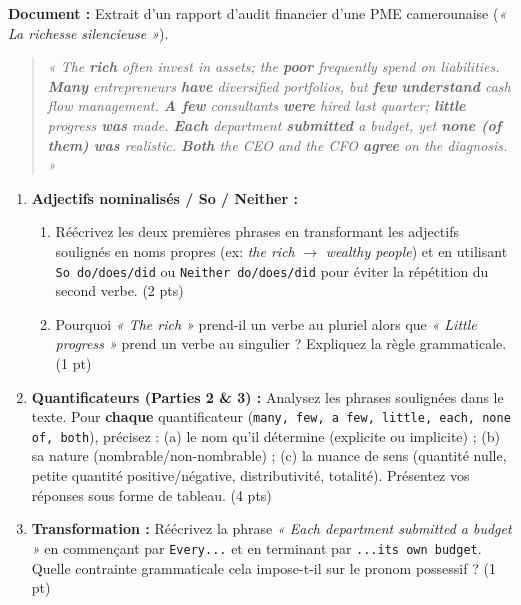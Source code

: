 \documentclass[11pt]{article}
\begin{document}
\begin{exercice}
\textbf{Document :} Extrait d'un rapport d'audit financier d'une PME camerounaise (\textit{« La richesse silencieuse »}).

\begin{quote}
\textit{« The \textbf{rich} often invest in assets; the \textbf{poor} frequently spend on liabilities. \textbf{Many} entrepreneurs \textbf{have} diversified portfolios, but \textbf{few} \textbf{understand} cash flow management. \textbf{A few} consultants \textbf{were} hired last quarter; \textbf{little} progress \textbf{was} made. \textbf{Each} department \textbf{submitted} a budget, yet \textbf{none (of them)} \textbf{was} realistic. \textbf{Both} the CEO and the CFO \textbf{agree} on the diagnosis. »}
\end{quote}

\begin{enumerate}
    \item \textbf{Adjectifs nominalisés / So / Neither :} 
    \begin{enumerate}
        \item Réécrivez les deux premières phrases en transformant les adjectifs soulignés en noms propres (ex: \textit{the rich} $\rightarrow$ \textit{wealthy people}) et en utilisant \texttt{So do/does/did} ou \texttt{Neither do/does/did} pour éviter la répétition du second verbe. (2 pts)
        \item Pourquoi \textit{« The rich »} prend-il un verbe au pluriel alors que \textit{« Little progress »} prend un verbe au singulier ? Expliquez la règle grammaticale. (1 pt)
    \end{enumerate}

    \item \textbf{Quantificateurs (Parties 2 \& 3) :} Analysez les phrases soulignées dans le texte. Pour \textbf{chaque} quantificateur (\texttt{many, few, a few, little, each, none of, both}), précisez : (a) le nom qu'il détermine (explicite ou implicite) ; (b) sa nature (nombrable/non-nombrable) ; (c) la nuance de sens (quantité nulle, petite quantité positive/négative, distributivité, totalité). Présentez vos réponses sous forme de tableau. (4 pts)

    \item \textbf{Transformation :} Réécrivez la phrase \textit{« Each department submitted a budget »} en commençant par \texttt{Every...} et en terminant par \texttt{...its own budget}. Quelle contrainte grammaticale cela impose-t-il sur le pronom possessif ? (1 pt)
\end{enumerate}
\end{exercice}
\end{document}
